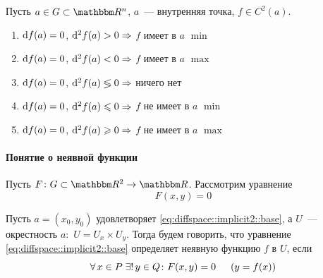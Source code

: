 \documentclass[12pt,trimbord]{../../../notes}
\begin{document}
\begin{thrm}\label{thrm:diffspace::extrema::suff}
  Пусть $a\in G \subset \R^n$, $a$~--- внутренняя точка, $f\in C^2(a)$.
  \begin{enumerate}
    \item $\mathrm{d} f(a) = 0$, $\mathrm{d}^2 f(a) > 0 \Rightarrow$ $f$ имеет в $a$ $\min$
    \item $\mathrm{d} f(a) = 0$, $\mathrm{d}^2 f(a) < 0 \Rightarrow$ $f$ имеет в $a$ $\max$
    \item $\mathrm{d} f(a) = 0$, $\mathrm{d}^2 f(a) \lessgtr 0 \Rightarrow$ ничего нет
    \item $\mathrm{d} f(a) = 0$, $\mathrm{d}^2 f(a) \leqslant 0 \Rightarrow$ $f$ не имеет в $a$ $\min$
    \item $\mathrm{d} f(a) = 0$, $\mathrm{d}^2 f(a) \geqslant 0 \Rightarrow$ $f$ не имеет в $a$ $\max$
  \end{enumerate}
\end{thrm}

\paragraph{Понятие о неявной функции}
\label{par:diffspace::implicit2}

\begin{defn}\label{defn:diffspace::implicit2}
  Пусть $F\colon G \subset \R^2 \to \R$. Рассмотрим уравнение
  \begin{equation}
    \label{eq:diffspace::implicit2::base}
    F(x, y) = 0
  \end{equation}

  Пусть $a =(x_0, y_0)$ удовлетворяет \eqref{eq:diffspace::implicit2::base}, 
  а $U$~--- окрестность $a \colon$ $U = U_x \times U_y$.
  Тогда будем говорить, что уравнение \eqref{eq:diffspace::implicit2::base} определяет неявную 
  функцию $f$ в $U$, если
  \[
    \forall\, x\in P \; \exists!\, y\in Q \colon F(x,y) = 0 \hspace{1.5em} (y = f(x))
  \]
\end{defn}
\end{document}
